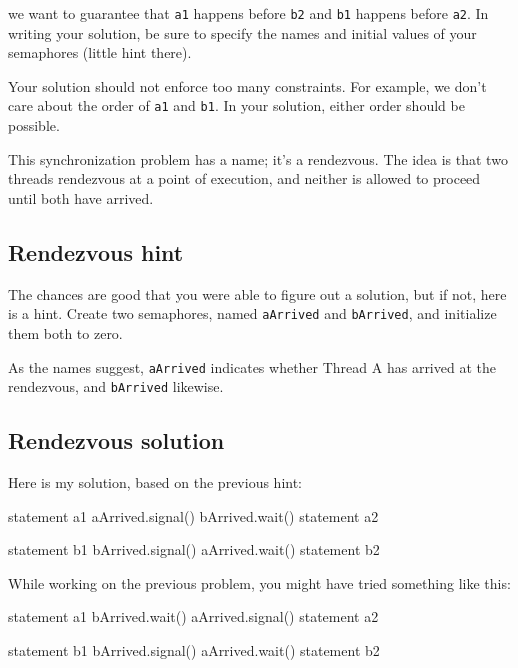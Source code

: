 \documentclass{book}
\begin{document}
we want to guarantee that {\tt a1} happens before {\tt b2} and
    {\tt b1} happens before {\tt a2}.  In writing your solution, be sure
to specify the names and initial values of your semaphores
(little hint there).

Your solution should not enforce too many constraints.  For example,
we don't care about the order of {\tt a1} and {\tt b1}.  In your
solution, either order should be possible.

This synchronization problem has a name; it's a
rendezvous.  The idea is that two threads rendezvous
at a point of execution, and neither is allowed to proceed
until both have arrived.

\subsection{Rendezvous hint}

The chances are good that you were able to figure out a solution,
but if not, here is a hint.  Create two semaphores, named {\tt aArrived}
and {\tt bArrived}, and initialize them both to zero.

As the names suggest, {\tt aArrived} indicates whether Thread A
has arrived at the rendezvous, and {\tt bArrived} likewise.


\subsection{Rendezvous solution}

Here is my solution, based on the previous hint:

\noindent\begin{minipage}[t]{0.4\textwidth}
    \begin{unbreakable}[title={Thread A}]{}
statement a1
aArrived.signal()
bArrived.wait()
statement a2
\end{unbreakable}
\end{minipage}
\hfill
\noindent\begin{minipage}[t]{0.4\textwidth}
    \begin{unbreakable}[title={Thread B}]{}
statement b1
bArrived.signal()
aArrived.wait()
statement b2
\end{unbreakable}
\end{minipage}

While working on the previous problem, you might have
tried something like this:

\noindent\begin{minipage}[t]{0.4\textwidth}
    \begin{unbreakable}[title={Thread A}]{}
statement a1
bArrived.wait()
aArrived.signal()
statement a2
\end{unbreakable}
\end{minipage}
\hfill
\noindent\begin{minipage}[t]{0.4\textwidth}
    \begin{unbreakable}[title={Thread B}]{}
statement b1
bArrived.signal()
aArrived.wait()
statement b2
\end{unbreakable}
\end{minipage}
\end{document}
